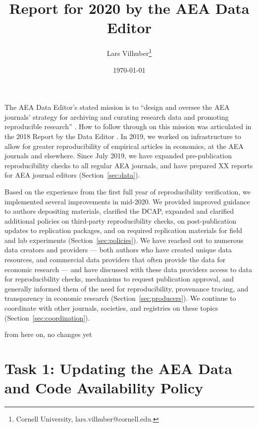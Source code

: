 \documentclass[PP]{AEA}
\begin{document}
\title{Report for 2020 by the AEA Data Editor }
\author{Lars Vilhuber\thanks{%
Cornell University, lars.vilhuber@cornell.edu. }
}
\date{\today}
\pubVolume{--}
\pubIssue{--}
\JEL{}




\maketitle

The \ac{AEA} Data Editor's stated mission is to ``design  and  oversee  the  AEA  journals’  strategy for archiving and curating research data and promoting  reproducible  research'' \citep{10.1257/pandp.108.745}. How to follow through on this mission was articulated in the 2018 Report by the Data Editor \citep{10.1257/pandp.109.718}. In 2019, we worked on infrastructure to allow for greater reproducibility of empirical articles in economics, at the \ac{AEA} journals and elsewhere. Since July 2019, we have expanded pre-publication reproducibility checks to all regular AEA journals, and have prepared XX reports for AEA journal editors (Section~\ref{sec:data}).

Based on the experience from the first full year of reproducibility verification, we implemented several improvements in mid-2020. We provided improved guidance to authors depositing materials, clarified the \ac{DCAP}, expanded and clarified additional policies on third-party reproducibility checks, on post-publication updates to replication packages, and on required replication materials for field and lab experiments  (Section~\ref{sec:policies}). We have reached out to numerous data creators and providers --- both authors who have created unique data resources, and commercial data providers that often provide the data for economic research --- and have discussed with these data providers access to data for reproducibility checks, mechanisms to request publication approval, and generally informed them of the need for reproducibility, provenance tracing, and transparency in economic research (Section~\ref{sec:producers}). 
We continue to coordinate with other journals, societies, and registries on these topics (Section~\ref{sec:coordination}).

\begin{center}
	from here on, no changes yet
\end{center}

\section{Task 1: Updating the AEA Data and Code Availability Policy}
\label{sec:dcap}
\end{document}
